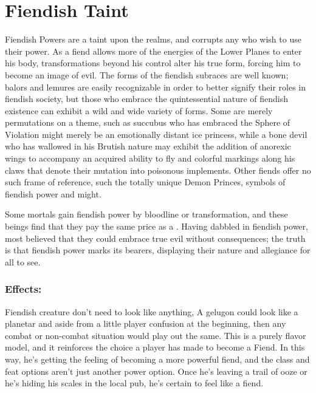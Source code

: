 \section{Fiendish Taint}

Fiendish Powers are a taint upon the realms, and corrupts any who wish to use their power. As a fiend allows more of the energies of the Lower Planes to enter his body, transformations beyond his control alter his true form, forcing him to become an image of evil. The forms of the fiendish subraces are well known; balors and lemures are easily recognizable in order to better signify their roles in fiendish society, but those who embrace the quintessential nature of fiendish existence can exhibit a wild and wide variety of forms. Some are merely permutations on a theme, such as succubus who has embraced the Sphere of Violation might merely be an emotionally distant ice princess, while a bone devil who has wallowed in his Brutish nature may exhibit the addition of anorexic wings to accompany an acquired ability to fly and colorful markings along his claws that denote their mutation into poisonous implements. Other fiends offer no such frame of reference, such the totally unique Demon Princes, symbols of fiendish power and might.

Some mortals gain fiendish power by bloodline or transformation, and these beings find that they pay the same price as a . Having dabbled in fiendish power, most believed that they could embrace true evil without consequences; the truth is that fiendish power marks its bearers, displaying their nature and allegiance for all to see.

\subsubsection{Effects:}

Fiendish creature don't need to look like anything, A gelugon could look like a planetar and aside from a little player confusion at the beginning, then any combat or non-combat situation would play out the same. This is a purely flavor model, and it reinforces the choice a player has made to become a Fiend. In this way, he's getting the feeling of becoming a more powerful fiend, and the class and feat options aren't just another power option. Once he's leaving a trail of ooze or he's hiding his scales in the local pub, he's certain to feel like a fiend.

